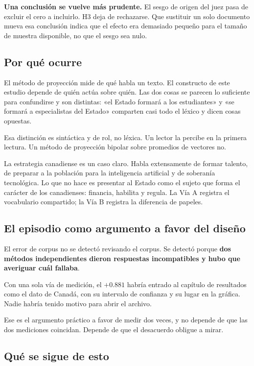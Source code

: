 \textbf{Una conclusión se vuelve más prudente.} El sesgo de origen del juez pasa de excluir el cero a incluirlo. H3 deja de rechazarse. Que sustituir un solo documento mueva esa conclusión indica que el efecto era demasiado pequeño para el tamaño de muestra disponible, no que el sesgo sea nulo.

\subsection{Por qué ocurre}

El método de proyección mide de qué habla un texto. El constructo de este estudio depende de quién actúa sobre quién. Las dos cosas se parecen lo suficiente para confundirse y son distintas: «el Estado formará a los estudiantes» y «se formará a especialistas del Estado» comparten casi todo el léxico y dicen cosas opuestas.

Esa distinción es sintáctica y de rol, no léxica. Un lector la percibe en la primera lectura. Un método de proyección bipolar sobre promedios de vectores no.

La estrategia canadiense es un caso claro. Habla extensamente de formar talento, de preparar a la población para la inteligencia artificial y de soberanía tecnológica. Lo que no hace es presentar al Estado como el sujeto que forma el carácter de los canadienses: financia, habilita y regula. La Vía A registra el vocabulario compartido; la Vía B registra la diferencia de papeles.

\subsection{El episodio como argumento a favor del diseño}

El error de corpus no se detectó revisando el corpus. Se detectó porque \textbf{dos métodos independientes dieron respuestas incompatibles y hubo que averiguar cuál fallaba}.

Con una sola vía de medición, el $+0.881$ habría entrado al capítulo de resultados como el dato de Canadá, con su intervalo de confianza y su lugar en la gráfica. Nadie habría tenido motivo para abrir el archivo.

Ese es el argumento práctico a favor de medir dos veces, y no depende de que las dos mediciones coincidan. Depende de que el desacuerdo obligue a mirar.

\subsection{Qué se sigue de esto}

